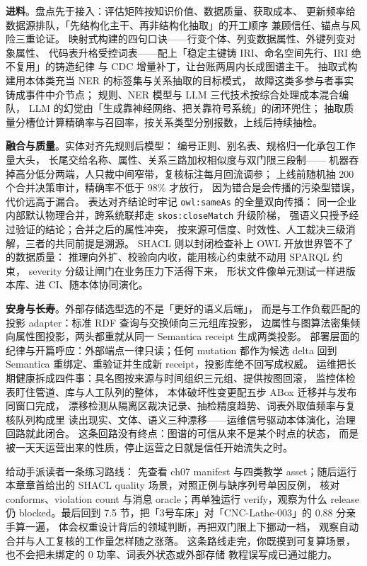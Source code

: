 \textbf{进料}。盘点先于接入：评估矩阵按知识价值、数据质量、获取成本、
更新频率给数据源排队，「先结构化主干、再非结构化抽取」的开工顺序
兼顾信任、锚点与风险三重论证。
映射式构建的四句口诀——行变个体、列变数据属性、外键列变对象属性、
代码表升格受控词表——配上「稳定主键铸 IRI、命名空间先行、IRI 绝不复用」的铸造纪律
与 CDC 增量补丁，让台账两周内长成图谱主干。
抽取式构建用本体类充当 NER 的标签集与关系抽取的目标模式，
故障这类多参与者事实铸成事件中介节点；
规则、NER 模型与 LLM 三代技术按综合处理成本混合编队，
LLM 的幻觉由「生成靠神经网络、把关靠符号系统」的闭环兜住；
抽取质量分槽位计算精确率与召回率，按关系类型分别报数，上线后持续抽检。

\textbf{融合与质量}。实体对齐先规则后模型：
编号正则、别名表、规格归一化承包工作量大头，
长尾交给名称、属性、关系三路加权相似度与双门限三段制——
机器吞掉高分低分两端，人只裁中间窄带，复核标注每月回流调参；
上线前随机抽 200 个合并决策审计，精确率不低于 98\% 才放行，
因为错合是会传播的污染型错误，代价远高于漏合。
表达对齐结论时牢记 \texttt{owl:sameAs} 的全量双向传播：
同一企业内部默认物理合并，跨系统联邦走 \texttt{skos:closeMatch} 升级阶梯，
强语义只授予经过验证的结论；合并之后的属性冲突，
按来源可信度、时效性、人工裁决三级消解，三者的共同前提是溯源。
SHACL 则以封闭检查补上 OWL 开放世界管不了的数据质量：
推理向外扩、校验向内收，能用核心约束就不动用 SPARQL 约束，
severity 分级让闸门在业务压力下活得下来，
形状文件像单元测试一样进版本库、进 CI、随本体协同演化。

\textbf{安身与长寿}。外部存储选型选的不是「更好的语义后端」，
而是与工作负载匹配的投影 adapter：标准 RDF 查询与交换倾向三元组库投影，
边属性与图算法密集倾向属性图投影，两头都重就从同一 Semantica receipt 生成两类投影。
部署层面的纪律与开篇呼应：外部端点一律只读；任何 mutation 都作为候选 delta
回到 Semantica 重绑定、重验证并生成新 receipt，投影库绝不回写成权威。
运维把长期健康拆成四件事：具名图按来源与时间组织三元组、提供按图回滚，
监控体检表盯住管道、库与人工队列的整体，
本体破坏性变更配五步 ABox 迁移并与发布同窗口完成，
漂移检测从隔离区裁决记录、抽检精度趋势、词表外取值频率与复核队列构成里
读出现实、文体、语义三种漂移——运维信号驱动本体演化，治理回路就此闭合。
这条回路没有终点：图谱的可信从来不是某个时点的状态，
而是被一天天运营出来的性质，停止运营之日就是信任开始流失之时。

给动手派读者一条练习路线：
先查看 ch07 manifest 与四类教学 asset；随后运行
本章章首给出的 SHACL quality 场景，对照正例与缺序列号单因反例，
核对 conforms、violation count 与消息 oracle；再单独运行 verify，观察为什么
release 仍 blocked。最后回到 7.5 节，把「3号车床」对「CNC-Lathe-003」的 0.88 分亲手算一遍，
体会权重设计背后的领域判断，再把双门限上下挪动一档，
观察自动合并与人工复核的工作量怎样随之涨落。
这条路线走完，你既摸到可复算场景，也不会把未绑定的 0 功率、词表外状态或外部存储
教程误写成已通过能力。

